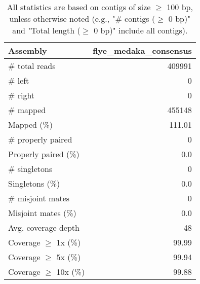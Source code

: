 \documentclass[12pt,a4paper]{article}
\begin{document}
\begin{table}[ht]
\begin{center}
\caption{All statistics are based on contigs of size $\geq$ 100 bp, unless otherwise noted (e.g., "\# contigs ($\geq$ 0 bp)" and "Total length ($\geq$ 0 bp)" include all contigs).}
\begin{tabular}{|l*{1}{|r}|}
\hline
Assembly & flye\_medaka\_consensus \\ \hline
\# total reads & 409991 \\ \hline
\# left & 0 \\ \hline
\# right & 0 \\ \hline
\# mapped & 455148 \\ \hline
Mapped (\%) & 111.01 \\ \hline
\# properly paired & 0 \\ \hline
Properly paired (\%) & 0.0 \\ \hline
\# singletons & 0 \\ \hline
Singletons (\%) & 0.0 \\ \hline
\# misjoint mates & 0 \\ \hline
Misjoint mates (\%) & 0.0 \\ \hline
Avg. coverage depth & 48 \\ \hline
Coverage $\geq$ 1x (\%) & 99.99 \\ \hline
Coverage $\geq$ 5x (\%) & 99.94 \\ \hline
Coverage $\geq$ 10x (\%) & 99.88 \\ \hline
\end{tabular}
\end{center}
\end{table}
\end{document}
